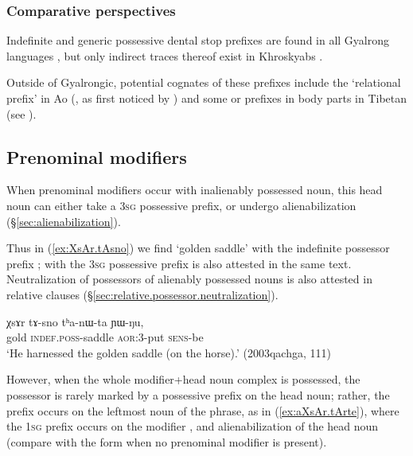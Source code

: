 \subsubsection{Comparative perspectives} \label{sec:indef.t.comparative}
Indefinite and generic possessive dental stop prefixes are found in all Gyalrong languages \citep{jackson98morphology}, but only indirect traces thereof exist in Khroskyabs  \citep[155]{lai17khroskyabs}. 

Outside of Gyalrongic, potential cognates of these prefixes include the `relational prefix'  in Ao (\citealt[84--85]{coupe07mongsen}, as first noticed by \citealt[141--142]{wolfenden29outlines}) and some  or  prefixes in body parts in Tibetan (see \citealt{jacques14snom}).
 
\subsection{Prenominal modifiers} \label{sec:possessive.prefixes.prenominal}
When prenominal modifiers occur with  inalienably possessed noun, this head noun can either take a \textsc{3sg} possessive prefix, or undergo alienabilization  (§\ref{sec:alienabilization}). 

Thus in (\ref{ex:XsAr.tAsno}) we find  `golden saddle' with the indefinite possessor prefix ;  with the \textsc{3sg} possessive prefix is also attested in the same text. Neutralization of possessors of alienably possessed nouns is also attested in relative clauses (§\ref{sec:relative.possessor.neutralization}).

\begin{exe}
\ex \label{ex:XsAr.tAsno}
\gll  χsɤr tɤ-sno tʰa-nɯ-ta ɲɯ-ŋu, \\
gold  \textsc{indef}.\textsc{poss}-saddle \textsc{aor}:3\flobv{}-put \textsc{sens}-be \\
\glt `He harnessed the golden saddle (on the horse).' (2003qachga, 111)
\end{exe}

However, when the whole modifier+head noun complex is possessed, the possessor is rarely marked by a possessive prefix on the head noun; rather, the prefix occurs on the leftmost noun of the phrase, as in (\ref{ex:aXsAr.tArte}), where the \textsc{1sg} prefix  occurs on the modifier , and alienabilization of the head noun  (compare with the form  when no prenominal modifier is present). %

